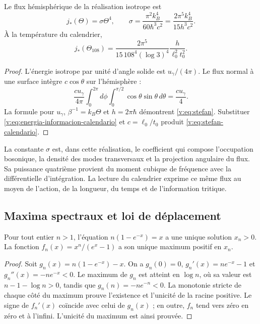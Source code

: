 \begin{proposition}
\label{v:prop:stefan}
Le flux hémisphérique de la réalisation isotrope est
\begin{equation}
 j_*(\Theta)=\sigma\Theta^4,\qquad
 \sigma=\frac{\pi^2 k_B^4}{60\hbar^3c^2}
 =\frac{2\pi^5k_B^4}{15h^3c^2}.
 \label{v:eq:stefan}
\end{equation}
À la température du calendrier,
\begin{equation}
 j_*(\Theta_{108})
 =\frac{2\pi^5}{15\,108^4(\log3)^4}
 \frac{h}{\ell_0^2t_0^2}.
 \label{v:eq:stefan-calendario}
\end{equation}
\end{proposition}
\begin{proof}
L’énergie isotrope par unité d’angle solide est
\(u_\gamma/(4\pi)\). Le flux normal à une surface intègre
\(c\cos\theta\) sur l’hémisphère :
\[
 \frac{cu_\gamma}{4\pi}
 \int_0^{2\pi}\!d\phi\int_0^{\pi/2}\cos\theta\sin\theta\,d\theta
 =\frac{cu_\gamma}{4}.
\]
La formule pour \(u_\gamma\), \(\beta^{-1}=k_B\Theta\) et
\(h=2\pi\hbar\) démontrent \eqref{v:eq:stefan}.
Substituer \eqref{v:eq:energia-informacion-calendario} et
\(c=\ell_0/t_0\) produit \eqref{v:eq:stefan-calendario}.
\end{proof}

La constante \(\sigma\) est, dans cette réalisation, le coefficient
qui compose l’occupation bosonique, la densité des modes transversaux et
la projection angulaire du flux. Sa puissance quatrième provient du moment
cubique de fréquence avec la différentielle d’intégration. La lecture
du calendrier exprime ce même flux au moyen de l’action, de la longueur,
du temps et de l’information tritique.

\newpage
\subsection{Maxima spectraux et loi de déplacement}

\begin{lemma}
\label{v:lem:raiz-wien}
Pour tout entier \(n>1\), l’équation
\(n(1-e^{-x})=x\) a une unique solution \(x_n>0\).
La fonction \(f_n(x)=x^n/(e^x-1)\) a son unique maximum positif en
\(x_n\).
\end{lemma}
\begin{proof}
Soit \(g_n(x)=n(1-e^{-x})-x\). On a
\(g_n(0)=0\), \(g_n'(x)=ne^{-x}-1\) et
\(g_n''(x)=-ne^{-x}<0\). Le maximum de \(g_n\) est atteint en
\(\log n\), où sa valeur est \(n-1-\log n>0\), tandis que
\(g_n(n)=-ne^{-n}<0\). La monotonie stricte de chaque côté du maximum
prouve l’existence et l’unicité de la racine positive. Le signe de
\(f_n'(x)\) coïncide avec celui de \(g_n(x)\) ; en outre, \(f_n\) tend
vers zéro en zéro et à l’infini. L’unicité du maximum est ainsi prouvée.
\end{proof}

